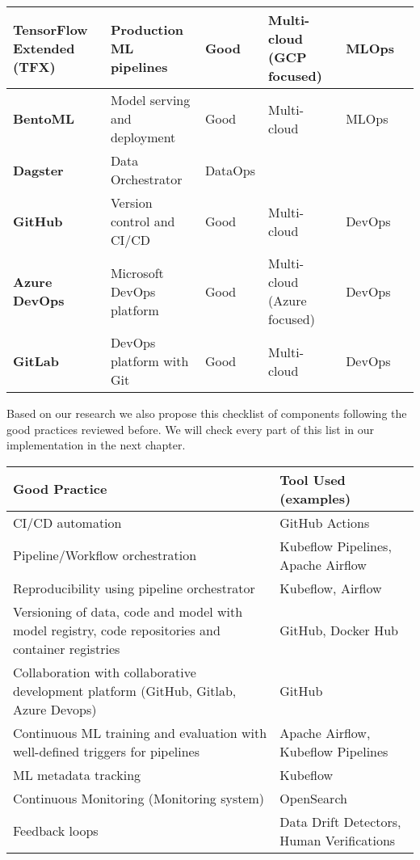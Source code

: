 \begin{longtable}{|p{2cm}|p{3.5cm}|p{2cm}|p{2cm}|p{1.5cm}|p{1.5cm}|}
    \textbf{TensorFlow Extended (TFX)} & Production ML pipelines & Good & Multi-cloud (GCP focused) & MLOps & \cite{Kreuzberger2022MachineLO} \\
    \hline

    \textbf{BentoML} & Model serving and deployment & Good & Multi-cloud & MLOps & \cite{9792270,BURGUENOROMERO2025107499,mlops-definition-tools-and-challenge} \\
    \hline

    \textbf{Dagster} & Data Orchestrator & DataOps & \cite{landscape} \\
    \hline

    \textbf{GitHub} & Version control and CI/CD & Good & Multi-cloud & DevOps & \cite{10.1145/3533378, mlops-gitops} \\
    \hline

    \textbf{Azure DevOps} & Microsoft DevOps platform & Good & Multi-cloud (Azure focused) & DevOps & \cite{Kreuzberger2022MachineLO,gift2021practical} \\
    \hline

    \textbf{GitLab} & DevOps platform with Git & Good & Multi-cloud & DevOps & \cite{9792270} \\
    \hline

\end{longtable}
\normalsize


Based on our research we also propose this checklist of components following the good practices reviewed before.
We will check every part of this list in our implementation in the next chapter.
\footnotesize
\begin{longtable}{|p{7cm}|p{6cm}|}
    \hline
    \textbf{Good Practice} & \textbf{Tool Used (examples)} \\
    \hline
    CI/CD automation & GitHub Actions\\
    \hline
    Pipeline/Workflow orchestration & Kubeflow Pipelines, Apache Airflow\\
    \hline
    Reproducibility using pipeline orchestrator & Kubeflow, Airflow \\
    \hline
    Versioning of data, code and model with model registry, code repositories and container registries & GitHub, Docker Hub \\
    \hline
    Collaboration with collaborative development platform (GitHub, Gitlab, Azure Devops) & GitHub \\
    \hline
    Continuous ML training and evaluation with well-defined triggers for pipelines & Apache Airflow, Kubeflow Pipelines\\
    \hline
    ML metadata tracking & Kubeflow \\
    \hline
    Continuous Monitoring (Monitoring system) & OpenSearch \\
    \hline
    Feedback loops & Data Drift Detectors, Human Verifications \\
    \hline
\end{longtable}
\normalsize